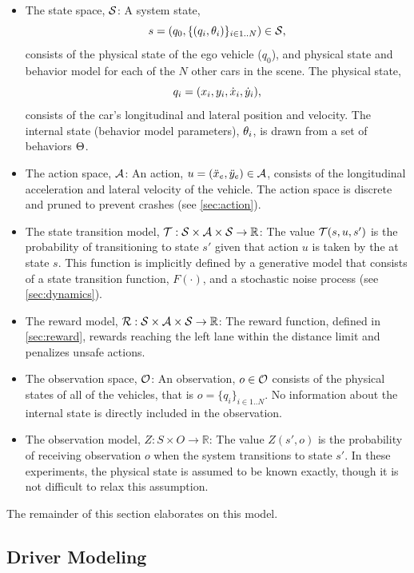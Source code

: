 \begin{itemize}
    \item The state space, $\mathcal{S}$: A system state, $$s = (q_0, \{({q}_i,{\theta}_i)\}_{i \in 1..N}) \in \mathcal{S}\text{,}$$ consists of the physical state of the ego vehicle ($q_0$), and physical state and behavior model for each of the $N$ other cars in the scene.
The physical state, $${q}_i = ({x}_i,{y}_i,{\dot{x}}_i,{\dot{y}}_i)\text{,}$$ consists of the car's longitudinal and lateral position and velocity. The internal state (behavior model parameters), ${\theta}_i$, is drawn from a set of behaviors $\Theta$.
    \item The action space, $\mathcal{A}$: An action, $u = ({\ddot{x}}_e, {\ddot{y}}_e) \in \mathcal{A}$, consists of the longitudinal acceleration and lateral velocity of the \av{} vehicle. The action space is discrete and pruned to prevent crashes (see \cref{sec:action}).
    \item The state transition model, $\mathcal{T}: \mathcal{S} \times \mathcal{A} \times \mathcal{S} \to \mathbb{R}$: The value $\mathcal{T}(s,u,s')$ is the probability of transitioning to state $s'$ given that action $u$ is taken by the \av{} at state $s$. This function is implicitly defined by a generative model that consists of a state transition function, $F(\cdot)$, and a stochastic noise process (see \cref{sec:dynamics}).
    \item The reward model, $\mathcal{R}:\mathcal{S} \times \mathcal{A} \times \mathcal{S} \to \mathbb{R}$: The reward function, defined in \cref{sec:reward}, rewards reaching the left lane within the distance limit and penalizes unsafe actions.
    \item The observation space, $\mathcal{O}$: An observation, $o \in \mathcal{O}$ consists of the physical states of all of the vehicles, that is $o=\{q_i\}_{i \in 1..N}$. No information about the internal state is directly included in the observation.
    \item The observation model, $Z: S \times O \to \mathbb{R}$: The value $Z(s',o)$ is the probability of receiving observation $o$ when the system transitions to state $s'$. In these experiments, the physical state is assumed to be known exactly, though it is not difficult to relax this assumption. %
\end{itemize}
The remainder of this section elaborates on this model.

\subsection{Driver Modeling} \label{sec:driver}


